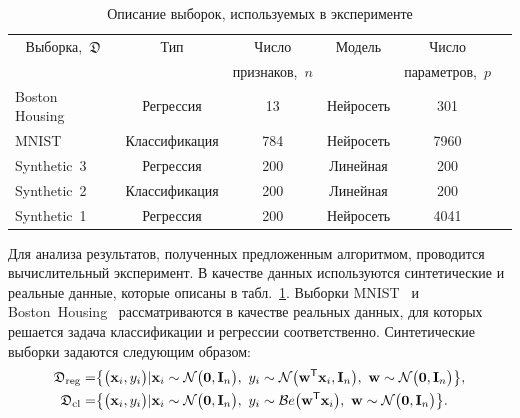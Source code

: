 \begin{table}[h!t]
\begin{center}
\caption{Описание выборок, используемых в эксперименте}
\label{tb:ex:1}
\begin{tabular}{|c|c|c|c|c|c|}
\hline
	Выборка,~$\mathfrak{D}$& Тип & Число& Модель& Число \\
	&& признаков,~$n$&&параметров,~$p$\\
	\hline
	\multicolumn{1}{|l|}{Boston Housing}&
	Регрессия& 13& Нейросеть& 301\\
	\hline
	\multicolumn{1}{|l|}{MNIST}&
	Классификация& 784& Нейросеть& 7960\\
	\hline
	\multicolumn{1}{|l|}{Synthetic~3}&
	Регрессия& 200& Линейная& 200\\
	\hline
	\multicolumn{1}{|l|}{Synthetic~2}&
	Классификация& 200& Линейная& 200\\
	\hline
	\multicolumn{1}{|l|}{Synthetic~1}&
	Регрессия& 200& Нейросеть& 4041\\
\hline

\end{tabular}
\end{center}
\end{table}

Для анализа результатов, полученных предложенным алгоритмом, проводится вычислительный эксперимент. В качестве данных используются синтетические и реальные данные, которые описаны в табл.~\ref{tb:ex:1}. Выборки MNIST~\cite{mnist} и Boston~Housing~\cite{Boston} рассматриваются в качестве реальных данных, для которых решается задача классификации и регрессии соответственно. Синтетические выборки задаются следующим образом:
\begin{equation}
\label{eq:ex:1}
\begin{aligned}
\mathfrak{D}_{\text{\text{reg}}} &= \bigr\{\bigr(\textbf{x}_i, y_i \bigr) |\textbf{x}_{i}\sim\mathcal{N}\bigr(\textbf{0}, \textbf{I}_{n}\bigr),~y_{i}\sim\mathcal{N}\bigr(\textbf{w}^{\mathsf{T}}\textbf{x}_{i}, \textbf{I}_{n}\bigr),~ \textbf{w} \sim \mathcal{N}\bigr(\textbf{0}, \textbf{I}_{n}\bigr)\bigr\},\\
\mathfrak{D}_{\text{\text{cl}}} &= \bigr\{\bigr(\textbf{x}_i, y_i \bigr) |\textbf{x}_{i}\sim\mathcal{N}\bigr(\textbf{0}, \textbf{I}_{n}\bigr),~y_{i}\sim\mathcal{B}e\bigr(\textbf{w}^{\mathsf{T}}\textbf{x}_{i}\bigr),~ \textbf{w} \sim \mathcal{N}\bigr(\textbf{0}, \textbf{I}_{n}\bigr)\bigr\}.
\end{aligned}
\end{equation}

